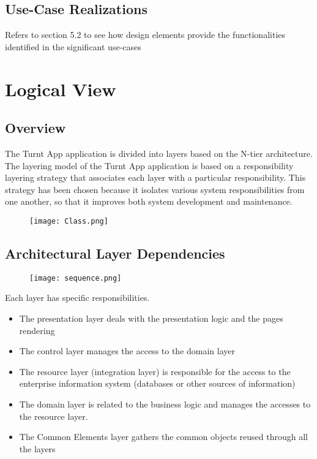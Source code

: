 \documentclass[10pt,a4paper]{article}
\begin{document}
\subsection{Use-Case Realizations}
Refers to section 5.2 to see how design elements provide the functionalities identified in the significant use-cases
\section{Logical View}
\subsection{Overview}
The Turnt App application is divided into layers based on the N-tier architecture.\\
The layering model of the Turnt App application is based on a responsibility layering strategy that associates each layer with a particular responsibility.
This strategy has been chosen because it isolates various system responsibilities from one another, so that it improves both system development and maintenance.

\begin{figure}[H]
\texttt{[image: Class.png]}
\end{figure}

\subsection{Architectural Layer Dependencies}
\begin{figure}[H]
\texttt{[image: sequence.png]}
\end{figure}
Each layer has specific responsibilities.
\begin{itemize}
\item The presentation layer deals with the presentation logic and the pages  rendering
\item The control layer manages the access to the domain layer
\item The resource layer (integration layer) is responsible for the access to the enterprise information system (databases or other sources of information)
\item The domain layer is related to the business logic and manages the accesses to the resource layer.
\item	The Common Elements layer gathers the common objects reused through all the layers
\end{itemize}
\end{document}

